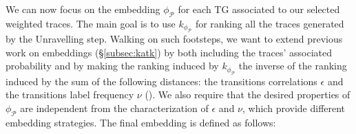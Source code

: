 {We can now focus on the embedding $\phi_{\mathcal{P}}$ for each TG associated to our selected weighted traces. The main goal is to use $k_{\phi_\mathcal{P}}$ for ranking all the traces generated by the Unravelling step. Walking on such footsteps, we  want to extend  previous work on embeddings (\S\ref{subsec:katk}) by both including the traces' associated probability and by making the ranking induced by $k_{\phi_\mathcal{P}}$ the inverse of the ranking induced by the sum of the following distances: the transitions correlations $\epsilon$ and the transitions label frequency $\nu$ (). }
{We also require that the desired properties of $\phi_{\mathcal{P}}$ are independent from the characterization of $\epsilon$ and $\nu$, which  provide different embedding strategies. } The final embedding is defined as follows:



